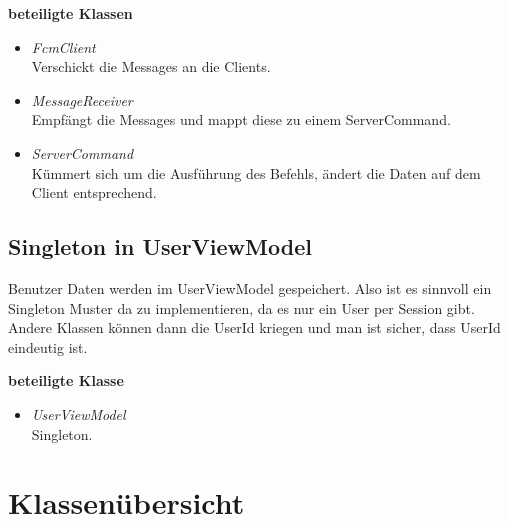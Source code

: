 \documentclass[11pt,a4paper]{article}
\begin{document}
\textbf{beteiligte Klassen}
\begin{itemize}
\item \textit{FcmClient} \\
Verschickt die Messages an die Clients.
\item \textit{MessageReceiver}\\
Empfängt die Messages und mappt diese zu einem ServerCommand.
\item \textit{ServerCommand}\\
Kümmert sich um die Ausführung des Befehls, ändert die Daten auf dem Client entsprechend.
\end{itemize}

\subsection{Singleton in UserViewModel}
Benutzer Daten werden im UserViewModel gespeichert. Also ist es sinnvoll ein Singleton Muster da zu implementieren, da es nur ein User per Session gibt. Andere Klassen können dann die UserId kriegen und man ist sicher, dass UserId eindeutig ist.

\textbf{beteiligte Klasse}
\begin{itemize}
\item \textit{UserViewModel} \\
Singleton.
\end{itemize}



\newpage

\section{Klassenübersicht}


\thispagestyle{empty}
\end{document}

